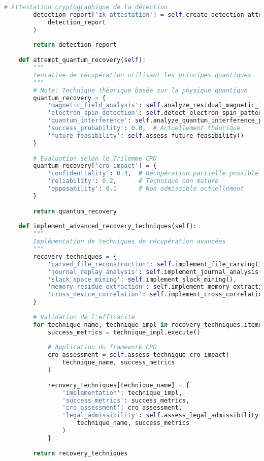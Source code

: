 \begin{lstlisting}[language=Python, caption=Détecteur d'effacement sécurisé et techniques de récupération]
        # Attestation cryptographique de la détection
        detection_report['zk_attestation'] = self.create_detection_attestation(
            detection_report
        )
        
        return detection_report
    
    def attempt_quantum_recovery(self):
        """
        Tentative de récupération utilisant les principes quantiques
        """
        # Note: Technique théorique basée sur la physique quantique
        quantum_recovery = {
            'magnetic_field_analysis': self.analyze_residual_magnetic_fields(),
            'electron_spin_detection': self.detect_electron_spin_patterns(),
            'quantum_interference': self.analyze_quantum_interference_patterns(),
            'success_probability': 0.0,  # Actuellement théorique
            'future_feasibility': self.assess_future_feasibility()
        }
        
        # Évaluation selon le Trilemme CRO
        quantum_recovery['cro_impact'] = {
            'confidentiality': 0.3,  # Récupération partielle possible
            'reliability': 0.2,      # Technique non mature
            'opposability': 0.1      # Non admissible actuellement
        }
        
        return quantum_recovery
    
    def implement_advanced_recovery_techniques(self):
        """
        Implémentation de techniques de récupération avancées
        """
        recovery_techniques = {
            'carved_file_reconstruction': self.implement_file_carving(),
            'journal_replay_analysis': self.implement_journal_analysis(),
            'slack_space_mining': self.implement_slack_mining(),
            'memory_residue_extraction': self.implement_memory_extraction(),
            'cross_device_correlation': self.implement_cross_correlation()
        }
        
        # Validation de l'efficacité
        for technique_name, technique_impl in recovery_techniques.items():
            success_metrics = technique_impl.execute()
            
            # Application du framework CRO
            cro_assessment = self.assess_technique_cro_impact(
                technique_name, success_metrics
            )
            
            recovery_techniques[technique_name] = {
                'implementation': technique_impl,
                'success_metrics': success_metrics,
                'cro_assessment': cro_assessment,
                'legal_admissibility': self.assess_legal_admissibility(
                    technique_name, success_metrics
                )
            }
            
        return recovery_techniques
\end{lstlisting}

